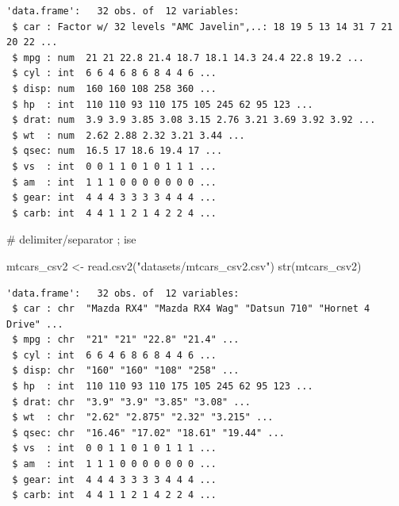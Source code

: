 \documentclass[
  letterpaper,
  DIV=11,
  numbers=noendperiod]{scrreprt}
\newenvironment{Shaded}{\begin{snugshade}}{\end{snugshade}}
\newcommand{\CommentTok}[1]{\textcolor[rgb]{0.37,0.37,0.37}{#1}}
\newcommand{\FunctionTok}[1]{\textcolor[rgb]{0.28,0.35,0.67}{#1}}
\newcommand{\NormalTok}[1]{\textcolor[rgb]{0.00,0.23,0.31}{#1}}
\newcommand{\OtherTok}[1]{\textcolor[rgb]{0.00,0.23,0.31}{#1}}
\newcommand{\StringTok}[1]{\textcolor[rgb]{0.13,0.47,0.30}{#1}}
\begin{document}
\begin{verbatim}
'data.frame':   32 obs. of  12 variables:
 $ car : Factor w/ 32 levels "AMC Javelin",..: 18 19 5 13 14 31 7 21 20 22 ...
 $ mpg : num  21 21 22.8 21.4 18.7 18.1 14.3 24.4 22.8 19.2 ...
 $ cyl : int  6 6 4 6 8 6 8 4 4 6 ...
 $ disp: num  160 160 108 258 360 ...
 $ hp  : int  110 110 93 110 175 105 245 62 95 123 ...
 $ drat: num  3.9 3.9 3.85 3.08 3.15 2.76 3.21 3.69 3.92 3.92 ...
 $ wt  : num  2.62 2.88 2.32 3.21 3.44 ...
 $ qsec: num  16.5 17 18.6 19.4 17 ...
 $ vs  : int  0 0 1 1 0 1 0 1 1 1 ...
 $ am  : int  1 1 1 0 0 0 0 0 0 0 ...
 $ gear: int  4 4 4 3 3 3 3 4 4 4 ...
 $ carb: int  4 4 1 1 2 1 4 2 2 4 ...
\end{verbatim}

\begin{Shaded}
\begin{Highlighting}[]
\CommentTok{\# delimiter/separator ; ise}

\NormalTok{mtcars\_csv2 }\OtherTok{\textless{}{-}} \FunctionTok{read.csv2}\NormalTok{(}\StringTok{"datasets/mtcars\_csv2.csv"}\NormalTok{)}
\FunctionTok{str}\NormalTok{(mtcars\_csv2)}
\end{Highlighting}
\end{Shaded}

\begin{verbatim}
'data.frame':   32 obs. of  12 variables:
 $ car : chr  "Mazda RX4" "Mazda RX4 Wag" "Datsun 710" "Hornet 4 Drive" ...
 $ mpg : chr  "21" "21" "22.8" "21.4" ...
 $ cyl : int  6 6 4 6 8 6 8 4 4 6 ...
 $ disp: chr  "160" "160" "108" "258" ...
 $ hp  : int  110 110 93 110 175 105 245 62 95 123 ...
 $ drat: chr  "3.9" "3.9" "3.85" "3.08" ...
 $ wt  : chr  "2.62" "2.875" "2.32" "3.215" ...
 $ qsec: chr  "16.46" "17.02" "18.61" "19.44" ...
 $ vs  : int  0 0 1 1 0 1 0 1 1 1 ...
 $ am  : int  1 1 1 0 0 0 0 0 0 0 ...
 $ gear: int  4 4 4 3 3 3 3 4 4 4 ...
 $ carb: int  4 4 1 1 2 1 4 2 2 4 ...
\end{verbatim}
\end{document}
